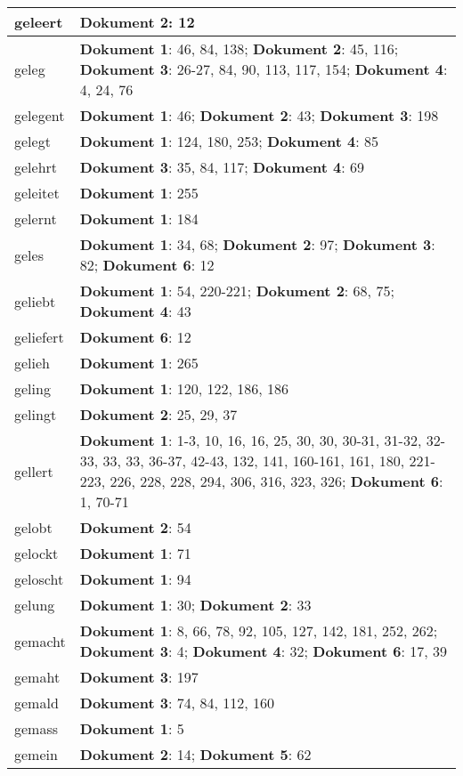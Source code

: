 \documentclass[a5paper]{article}
\begin{document}
\begin{longtable}[l]{|l|p{3in}|}
\hline
geleert & \textbf{Dokument 2}: 12 \\
\hline
geleg & \textbf{Dokument 1}: 46, 84, 138; \textbf{Dokument 2}: 45, 116; \textbf{Dokument 3}: 26-27, 84, 90, 113, 117, 154; \textbf{Dokument 4}: 4, 24, 76 \\
\hline
gelegent & \textbf{Dokument 1}: 46; \textbf{Dokument 2}: 43; \textbf{Dokument 3}: 198 \\
\hline
gelegt & \textbf{Dokument 1}: 124, 180, 253; \textbf{Dokument 4}: 85 \\
\hline
gelehrt & \textbf{Dokument 3}: 35, 84, 117; \textbf{Dokument 4}: 69 \\
\hline
geleitet & \textbf{Dokument 1}: 255 \\
\hline
gelernt & \textbf{Dokument 1}: 184 \\
\hline
geles & \textbf{Dokument 1}: 34, 68; \textbf{Dokument 2}: 97; \textbf{Dokument 3}: 82; \textbf{Dokument 6}: 12 \\
\hline
geliebt & \textbf{Dokument 1}: 54, 220-221; \textbf{Dokument 2}: 68, 75; \textbf{Dokument 4}: 43 \\
\hline
geliefert & \textbf{Dokument 6}: 12 \\
\hline
gelieh & \textbf{Dokument 1}: 265 \\
\hline
geling & \textbf{Dokument 1}: 120, 122, 186, 186 \\
\hline
gelingt & \textbf{Dokument 2}: 25, 29, 37 \\
\hline
gellert & \textbf{Dokument 1}: 1-3, 10, 16, 16, 25, 30, 30, 30-31, 31-32, 32-33, 33, 33, 36-37, 42-43, 132, 141, 160-161, 161, 180, 221-223, 226, 228, 228, 294, 306, 316, 323, 326; \textbf{Dokument 6}: 1, 70-71 \\
\hline
gelobt & \textbf{Dokument 2}: 54 \\
\hline
gelockt & \textbf{Dokument 1}: 71 \\
\hline
geloscht & \textbf{Dokument 1}: 94 \\
\hline
gelung & \textbf{Dokument 1}: 30; \textbf{Dokument 2}: 33 \\
\hline
gemacht & \textbf{Dokument 1}: 8, 66, 78, 92, 105, 127, 142, 181, 252, 262; \textbf{Dokument 3}: 4; \textbf{Dokument 4}: 32; \textbf{Dokument 6}: 17, 39 \\
\hline
gemaht & \textbf{Dokument 3}: 197 \\
\hline
gemald & \textbf{Dokument 3}: 74, 84, 112, 160 \\
\hline
gemass & \textbf{Dokument 1}: 5 \\
\hline
gemein & \textbf{Dokument 2}: 14; \textbf{Dokument 5}: 62 \\

\end{longtable}
\end{document}
